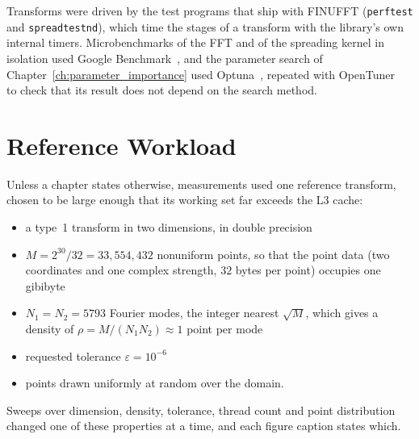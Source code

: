 Transforms were driven by the test programs that ship with FINUFFT (\texttt{perftest} and \texttt{spreadtestnd}), which time the stages of a transform with the library's own internal timers. Microbenchmarks of the FFT and of the spreading kernel in isolation used Google Benchmark~\cite{googlebenchmark}, and the parameter search of Chapter~\ref{ch:parameter_importance} used Optuna~\cite{optuna2019}, repeated with OpenTuner~\cite{ansel2014opentuner} to check that its result does not depend on the search method.

\section{Reference Workload}
\label{sec:workload}

Unless a chapter states otherwise, measurements used one reference transform, chosen to be large enough that its working set far exceeds the L3 cache:

\begin{itemize}
    \item a type~1 transform in two dimensions, in double precision
    \item $M = 2^{30}/32 = 33{,}554{,}432$ nonuniform points, so that the point data (two coordinates and one complex strength, $32$ bytes per point) occupies one gibibyte
    \item $N_1 = N_2 = 5793$ Fourier modes, the integer nearest $\sqrt{M}$, which gives a density of $\rho = M/(N_1 N_2) \approx 1$ point per mode
    \item requested tolerance $\varepsilon = 10^{-6}$
    \item points drawn uniformly at random over the domain.
\end{itemize}

Sweeps over dimension, density, tolerance, thread count and point distribution changed one of these properties at a time, and each figure caption states which.

